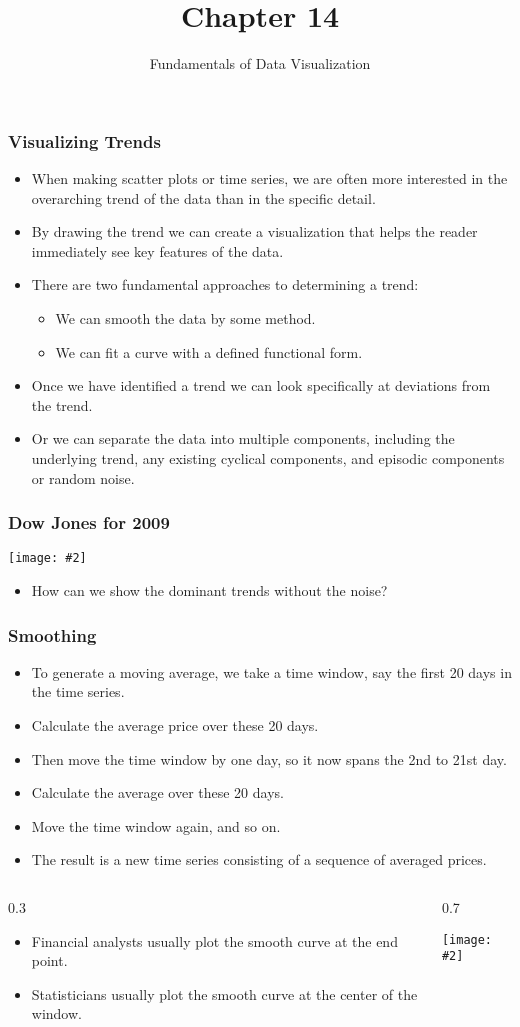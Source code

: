 \documentclass{beamer}
\author{Fundamentals of Data Visualization}
\title{Chapter 14}
\newcommand{\bi}{\begin{itemize}}
\newcommand{\li}{\item}
\newcommand{\ei}{\end{itemize}}
\newcommand{\fig}[2]{\centerline{\texttt{[image: \#2]}}}
\newcommand{\bfr}[1]{\begin{frame}[fragile]\frametitle{{ #1 }}}
\newcommand{\cola}[1]{\begin{columns}\begin{column}{#1\textwidth}}
\newcommand{\colb}[1]{\end{column}\begin{column}{#1\textwidth}}
\newcommand{\colc}{\end{column}\end{columns}}
\begin{document}
\begin{frame}
\maketitle
\end{frame}

\bfr{Visualizing Trends}
\bi
\li When making scatter plots  or time series, we are often more interested in the overarching trend of the data than in the specific detail. 
\li By drawing the trend  we can create a visualization that helps the reader immediately see key features of the data.
\li There are two fundamental approaches to determining a trend: 
\bi
\li We can  smooth the data by some method.
\li We can fit a curve with a defined functional form. 
\ei
\li Once we have identified a trend we can look specifically at deviations from the trend.
\li Or we can separate the data into multiple components, including the underlying trend, any existing cyclical components, and episodic components or random noise.
\ei
\end{frame}

\bfr{Dow Jones for 2009}
\fig{1}{dow-jones-1.png}
\bi
\li How can we show the dominant trends without the noise?
\ei
\end{frame}

\bfr{Smoothing}
\bi
\li To generate a moving average, we take a time window, say the first 20 days in the time series.
\li Calculate the average price over these 20 days. 
\li Then move the time window by one day, so it now spans the 2nd to 21st day.
\li Calculate the average over these 20 days.
\li Move the time window again, and so on.
\li The result is a new time series consisting of a sequence of averaged prices.
\ei
\end{frame}


\begin{frame}
\cola{0.3}
\bi
\li Financial analysts usually plot the smooth curve at the end point.
\li Statisticians usually plot the smooth curve at the center of the window.
\ei
\colb{0.7}
\fig{1.1}{dow-jones-moving-ave-1.png}
\colc
\end{frame}
\end{document}

